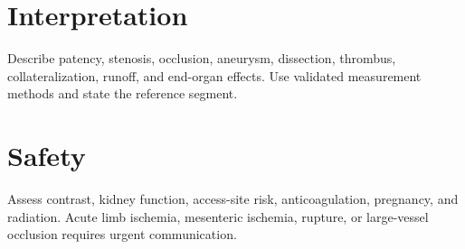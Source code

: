 \section{Interpretation}
Describe patency, stenosis, occlusion, aneurysm, dissection, thrombus, collateralization, runoff, and end-organ effects. Use validated measurement methods and state the reference segment.

\section{Safety}
Assess contrast, kidney function, access-site risk, anticoagulation, pregnancy, and radiation. Acute limb ischemia, mesenteric ischemia, rupture, or large-vessel occlusion requires urgent communication.

\clearpage
